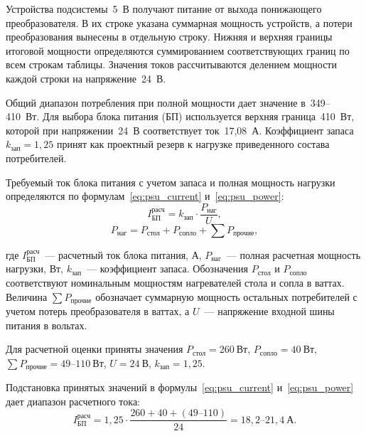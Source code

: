 Устройства подсистемы~5~В получают питание от выхода понижающего преобразователя. В их строке указана суммарная мощность устройств, а потери преобразования вынесены в отдельную строку. Нижняя и верхняя границы итоговой мощности определяются суммированием соответствующих границ по всем строкам таблицы. Значения токов рассчитываются делением мощности каждой строки на напряжение~24~В.

Общий диапазон потребления при полной мощности дает значение в~349--410~Вт. Для выбора блока питания (БП) используется верхняя граница~410~Вт, которой при напряжении~24~В соответствует ток~17,08~А. Коэффициент запаса \(k_{\text{зап}}=1{,}25\) принят как проектный резерв к нагрузке приведенного состава потребителей.

\begin{samepage}
Требуемый ток блока питания с учетом запаса и полная мощность нагрузки определяются по формулам~\eqref{eq:psu_current} и~\eqref{eq:psu_power}:
\begin{equation}
I_{\text{БП}}^{\text{расч}} =
k_{\text{зап}} \cdot \frac{P_{\text{наг}}}{U},
\label{eq:psu_current}
\end{equation}
\begin{equation}
P_{\text{наг}} =
P_{\text{стол}} + P_{\text{сопло}} + \sum P_{\text{прочие}},
\label{eq:psu_power}
\end{equation}
\end{samepage}

\noindent где \(I_{\text{БП}}^{\text{расч}}\)~--- расчетный ток блока питания, А, \(P_{\text{наг}}\)~--- полная расчетная мощность нагрузки, Вт, \(k_{\text{зап}}\)~--- коэффициент запаса. Обозначения \(P_{\text{стол}}\) и \(P_{\text{сопло}}\) соответствуют номинальным мощностям нагревателей стола и сопла в ваттах. Величина \(\sum P_{\text{прочие}}\) обозначает суммарную мощность остальных потребителей с учетом потерь преобразователя в ваттах, а \(U\)~--- напряжение входной шины питания в вольтах.

Для расчетной оценки приняты значения \(P_{\text{стол}}=260~\text{Вт}\), \(P_{\text{сопло}}=40~\text{Вт}\), \(\sum P_{\text{прочие}}=49\text{--}110~\text{Вт}\), \(U=24~\text{В}\), \(k_{\text{зап}}=1{,}25\).
\begin{samepage}
Подстановка принятых значений в формулы~\eqref{eq:psu_current} и~\eqref{eq:psu_power} дает диапазон расчетного тока:
\begin{equation}
I_{\text{БП}}^{\text{расч}} =
1{,}25 \cdot \frac{260 + 40 + (49\text{--}110)}{24}
= 18{,}2\text{--}21{,}4~\text{А}.
\label{eq:psu_current_range}
\end{equation}
\end{samepage}

